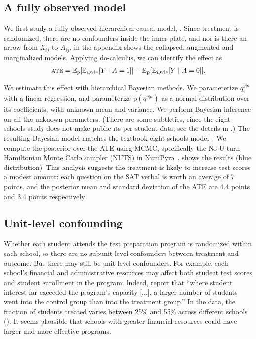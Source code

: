 \documentclass[12pt]{article}
\newcommand{\pr}{\mathrm{p}}
\begin{document}
\subsection{A fully observed model} \label{sec:schools_initial}

We first study a fully-observed hierarchical causal model,
. Since treatment is randomized, there
are no confounders inside the inner plate, and nor is there an arrow
from $X_{ij}$ to $A_{ij}$.  in the appendix
shows the collapsed, augmented and marginalized models. Applying
do-calculus, we can identify the effect as
\begin{align}
  \label{eq:8-schools_id}
  \textsc{ate} = \mathbb{E}_\pr[\mathbb{E}_{Q^{y|a}}[Y \mid A = 1]] -
  \mathbb{E}_\pr[\mathbb{E}_{Q^{y|a}}[Y \mid A = 0]].
\end{align}

We estimate this effect with hierarchical Bayesian methods. We
parameterize $q^{y|a}_i$ with a linear regression, and parameterize
$\pr(q^{y|a})$ as a normal distribution over its coefficients, with
unknown mean and variance. We perform Bayesian inference on all the
unknown parameters. (There are some subtleties, since the
eight-schools study does not make public its per-student data; see the
details in .) The resulting Bayesian
model matches the textbook eight schools model~\citep{Gelman2013-cv}.
We compute the posterior over the ATE using MCMC, specifically the
No-U-turn Hamiltonian Monte Carlo sampler (NUTS) in
NumPyro~\citep{Hoffman2014-ic,Phan2019-om,Bingham2019-aa}.
 shows the results (blue distribution).
This analysis suggests the treatment is likely to increase test scores a modest amount: each question on the SAT verbal is worth an average of 7 points, and the posterior mean and standard deviation of the ATE are 4.4 points and 3.4 points respectively.


\subsection{Unit-level confounding}
\label{sec:schools_confounding}

Whether each student attends the test preparation program is
randomized within each school, so there are no subunit-level
confounders between treatment and outcome. But there may still be
unit-level confounders. For example, each school's financial and
administrative resources may affect both student test scores and
student enrollment in the program. Indeed, \citet{Alderman1979-on}
report that ``where student interest far exceeded the program's
capacity [...], a larger number of students went into the control
group than into the treatment group.'' In the data, the fraction of students treated varies between 25\% and 55\% across different schools ().
It seems plausible that schools
with greater financial resources could have larger and more
effective programs.
\end{document}
